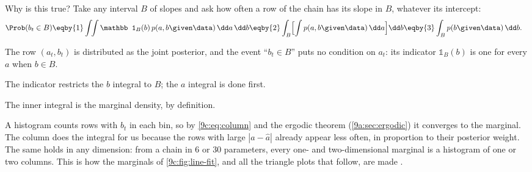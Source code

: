 Why is this true? Take any interval $B$ of slopes and ask how often a row of the chain has its
slope in $B$, whatever its intercept:
\begin{align}
  \Prob(b_t\in B)
  &\eqby{1}\int\!\!\int \mathbb 1_B(b)\,p(a,b\given\data)\,\dd a\,\dd b
   \eqby{2}\int_B\Bigl[\int p(a,b\given\data)\,\dd a\Bigr]\dd b
   \eqby{3}\int_Bp(b\given\data)\,\dd b .
  \label{9c:eq:column}
\end{align}
\begin{explain}
  \item The row $(a_t,b_t)$ is distributed as the joint posterior, and the event ``$b_t\in B$''
        puts no condition on $a_t$: its indicator $\mathbb 1_B(b)$ is one for every $a$ when $b\in B$.
  \item The indicator restricts the $b$ integral to $B$; the $a$ integral is done first.
  \item The inner integral is the marginal density, by definition.
\end{explain}
A histogram counts rows with $b_t$ in each bin, so by \eqref{9c:eq:column} and the ergodic theorem
(\cref{9a:sec:ergodic}) it converges to the marginal. The column does the integral for us because
the rows with large $|a-\hat a|$ already appear less often, in proportion to their posterior weight.
The same holds in any dimension: from a chain in 6 or 30 parameters, every one- and
two-dimensional marginal is a histogram of one or two columns. This is how the marginals of
\cref{9c:fig:line-fit}, and all the triangle plots that follow, are made
.

